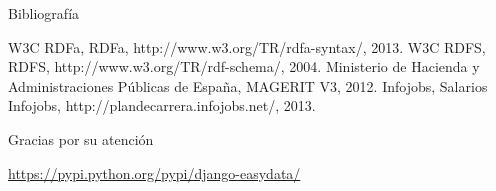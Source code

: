 \documentclass[spanish,xcolor=table,svgnames]{beamer}
\begin{document}
\begin{frame}{Bibliografía}
  \begin{thebibliography}{10}
    \beamertemplatebookbibitems
     W3C RDFa, RDFa, http://www.w3.org/TR/rdfa-syntax/, 2013.
     W3C RDFS, RDFS, http://www.w3.org/TR/rdf-schema/, 2004.
     Ministerio de Hacienda y Administraciones Públicas de España, MAGERIT V3, 2012.
     Infojobs, Salarios Infojobs, http://plandecarrera.infojobs.net/, 2013.
  \end{thebibliography} 
\end{frame}


\appendix
\frame
{
  \begin{center}
    \Huge{Gracias por su atención}
  \end{center}
  \begin{center}
    \url{https://pypi.python.org/pypi/django-easydata/}
  \end{center}
}
\end{document}
